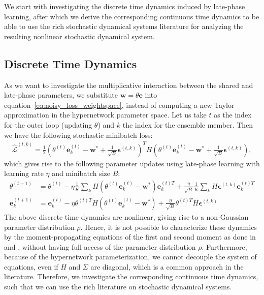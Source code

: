 \documentclass{article} \usepackage{iclr2021_conference,times}
\def\eqref#1{equation~\ref{#1}}
\begin{document}
We start with investigating the discrete time dynamics induced by late-phase learning, after which we derive the corresponding continuous time dynamics to be able to use the rich stochastic dynamical systems literature for analyzing the resulting nonlinear stochastic dynamical system.

\subsection{Discrete Time Dynamics}
As we want to investigate the multiplicative interaction between the shared and late-phase parameters, we substitute $\mathbf{w} = \theta \mathbf{e}$ into \eqref{eq:noisy_loss_weightspace}, instead of computing a new Taylor approximation in the hypernetwork parameter space. Let us take $t$ as the index for the outer loop (updating $\theta$) and $k$ the index for the ensemble member. Then we have the following stochastic minibatch loss:
\begin{align}
    \hat{\mathcal{L}}^{(t,k)} = \frac{1}{2}(\theta^{(t)} \mathbf{e}_k^{(t)} - \mathbf{w}^* +  \frac{1}{\sqrt{B}}\boldsymbol{\epsilon}^{(t,k)})^T H (\theta^{(t)} \mathbf{e}_k^{(t)} - \mathbf{w}^* + \frac{1}{\sqrt{B}}\boldsymbol{\epsilon}^{(t,k)}),
\end{align}
which gives rise to the following parameter updates using late-phase learning with learning rate $\eta$ and minibatch size $B$:
\begin{align}
    \theta^{(t+1)} &= \theta^{(t)} - \eta \frac{1}{K}\sum_k H( \theta^{(t)}\mathbf{e}_k^{(t)} - \mathbf{w}^*)\mathbf{e}_k^{(t)T} + \frac{\eta}{\sqrt{B}} \frac{1}{K}\sum_k H \boldsymbol{\epsilon}^{(t,k)}\mathbf{e}_k^{(t)T} \label{eq:theta_discrete_time_dynamics}\\
    \mathbf{e}_k^{(t+1)} &= \mathbf{e}_k^{(t)} - \eta \theta^{(t)T} H (\theta^{(t)}\mathbf{e}_k^{(t)} - \mathbf{w}^*) + \frac{\eta}{\sqrt{B}} \theta^{(t)T} H \boldsymbol{\epsilon}^{(t,k)} \label{eq:embedding_discrete_time_dynamics}
\end{align}
The above discrete time dynamics are nonlinear, giving rise to a non-Gaussian parameter distribution $\rho$. Hence, it is not possible to characterize these dynamics by the moment-propagating equations of the first and second moment as done in \citet{zhang_which_2019, zhang_lookahead_2019, schaul_no_2013} and \citet{wu_understanding_2018}, without having full access of the parameter distribution $\rho$. Furthermore, because of the hypernetwork parameterization, we cannot decouple the system of equations, even if $H$ and $\Sigma$ are diagonal, which is a common approach in the literature. Therefore, we investigate the corresponding continuous time dynamics, such that we can use the rich literature on stochastic dynamical systems.
\end{document}
